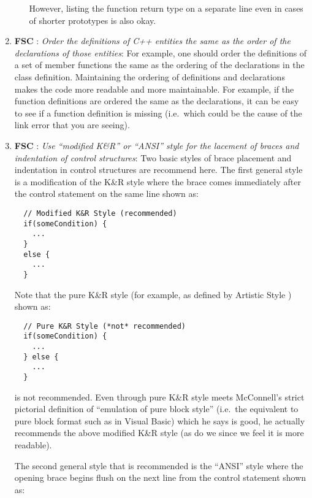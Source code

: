 \begin{enumerate}
\begin{enumerate}
  However, listing the function return type on a separate line even in cases
  of shorter prototypes is also okay.

  \end{enumerate}

{}\item{}\textbf{FSC }:
{}\textit{Order the definitions of C++ entities the same as the order of
the declarations of those entities}: For example, one should order the
definitions of a set of member functions the same as the ordering of the
declarations in the class definition.  Maintaining the ordering of definitions
and declarations makes the code more readable and more maintainable.  For
example, if the function definitions are ordered the same as the declarations,
it can be easy to see if a function definition is missing (i.e.\ which could
be the cause of the link error that you are seeing).

{}\item{}\textbf{FSC }:
{}\textit{Use ``modified K\&R'' or ``ANSI'' style for the lacement of
braces and indentation of control structures}: Two basic styles of brace
placement and indentation in control structures are recommend here.  The first
general style is a modification of the K\&R style{}\cite{ArtisticStyle} where
the brace comes immediately after the control statement on the same line shown
as:

{\small\begin{verbatim}
  // Modified K&R Style (recommended)
  if(someCondition) {
    ...
  }
  else {
    ...
  }
\end{verbatim}}

Note that the pure K\&R style (for example, as defined by Artistic Style
{}\cite{ArtisticStyle}) shown as:

{\small\begin{verbatim}
  // Pure K&R Style (*not* recommended)
  if(someCondition) {
    ...
  } else {
    ...
  }
\end{verbatim}}

is not recommended.  Even through pure K\&R style meets McConnell's strict
pictorial definition of ``emulation of pure block style'' (i.e.\ the
equivalent to pure block format such as in Visual Basic) which he says is
good, he actually recommends the above modified K\&R style (as do we since we
feel it is more readable).

The second general style that is recommended is the ``ANSI''
style{}\cite{ArtisticStyle} where the opening brace begins flush on the next
line from the control statement shown as:


\end{enumerate}
